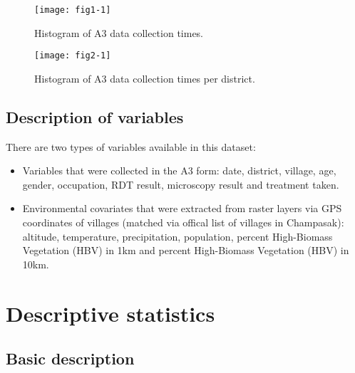 \documentclass{article}\usepackage[]{graphicx}\usepackage[]{color}
\begin{document}
\begin{figure}
\begin{center}

\texttt{[image: fig1-1]}
\end{center}
\caption{Histogram of A3 data collection times.}
\label{fig:Histogram_Date}
\end{figure}

\begin{figure}
\begin{center}

\texttt{[image: fig2-1]}
\end{center}
\caption{Histogram of A3 data collection times per district.}
\label{fig:Histogram_Date_District}
\end{figure}

\subsection{Description of variables}
There are two types of variables available in this dataset:
\begin{itemize}
\item Variables that were collected in the A3 form: date, district, village, age, gender, occupation, RDT result, microscopy result and treatment taken.
\item Environmental covariates that were extracted from raster layers via GPS coordinates of villages (matched via offical list of villages in Champasak): altitude, temperature, precipitation, population, percent High-Biomass Vegetation (HBV) in 1km and percent High-Biomass Vegetation (HBV) in 10km.
\end{itemize}


\section{Descriptive statistics}
\subsection{Basic description}
\end{document}

